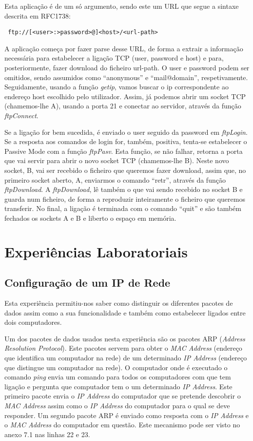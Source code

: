 \documentclass[a4paper]{article}
\begin{document}
Esta aplicação é de um só argumento, sendo este um URL que segue a sintaxe descrita em RFC1738: \begin{verbatim} ftp://[<user>:>password>@]<host>/<url-path> \end{verbatim}
A aplicação começa por fazer parse desse URL, de forma a extrair a informação necessária para estabelecer a ligação TCP (user, password e host) e para, posteriormente, fazer download do ficheiro url-path. O user e password podem ser omitidos, sendo assumidos como “anonymous” e “mail@domain”, respetivamente.
Seguidamente, usando a função \textit{getip}, vamos buscar o ip correspondente ao endereço host escolhido pelo utilizador. Assim, já podemos abrir um socket TCP (chamemos-lhe A), usando a porta 21 e conectar ao servidor, através da função \textit{ftpConnect}. 
 
Se a ligação for bem sucedida, é enviado o user seguido da password em \textit{ftpLogin}. Se a resposta aos comandos de login for, também, positiva, tenta-se estabelecer o Passive Mode com a função \textit{ftpPasv}. Esta função, se não falhar, retorna a porta que vai servir para abrir o novo socket TCP (chamemos-lhe B). Neste novo socket, B, vai ser recebido o ficheiro que queremos fazer download, assim que, no primeiro socket aberto, A, enviarmos o comando “retr”, através da função \textit{ftpDownload}. A \textit{ftpDownload}, lê também o que vai sendo recebido no socket B e guarda num ficheiro, de forma a reproduzir inteiramente o ficheiro que queremos transferir.
No final, a ligação é terminada com o comando “quit” e são também fechados os sockets A e B e liberto o espaço em memória.

\section{Experiências Laboratoriais}
\subsection{Configuração de um IP de Rede}
Esta experiência permitiu-nos saber como distinguir os diferentes pacotes de dados assim como a sua funcionalidade e também como estabelecer ligados entre dois computadores.

Um dos pacotes de dados usados nesta experiência são os pacotes ARP (\textit{Address Resolution Protocol}). Este pacotes servem para obter o \textit{MAC Address} (endereço que identifica um computador na rede) de um determinado \textit{IP Address} (endereço que distingue um computador na rede). O computador onde é executado o comando \textit{ping} envia um comando para todos os computadores com que tem ligação e pergunta que computador tem o um determinado \textit{IP Address}. Este primeiro pacote envia o \textit{IP Address} do computador que se pretende descobrir o \textit{MAC Address} assim como o \textit{IP Address} do computador para o qual se deve responder. Um segundo pacote ARP é enviado como resposta com o \textit{IP Address} e o \textit{MAC Address} do computador em questão. Este mecanismo pode ser visto no anexo 7.1 nas linhas 22 e 23.
\end{document}
